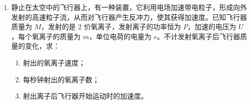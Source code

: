 \documentclass[\gkver]{gaokaozhenti}
\begin{document}
\begin{enumerate}
{$p = \frac{T}{T_{1}}p_{1}$                                                ①

以 $p_{1} = 76 - 16 = 60\UcmHg$，$T_{1} = 273 + 27 = 300\UK$，$T = 273\UK$

代入上式，得 $p = \frac{273}{300}\times 60 = 54.6\UcmHg$

$x = 76 - 54.6 = 21.4\Ucm$

（2）此时 A 泡内气体压强

$p' = 75 - 16 = 59\UcmHg$

实际温度：$T' = \frac{p'}{p}T_{1}$                                                ②

代入数据：$T' = \frac{59}{60}\times 300 = 295\UK = 22\UdC$

\textbf{评分标准}：（1）6 分。知道为等容过程并列出①式得 3 分，得出 $x = 21.4\Ucm$ 得 3 分。

（2）6 分。求出 $p' = 59\UcmHg$ 得 2 分，由公式②求出 $T = 295\UK$（或 $22\UdC$）得 4 分。其中公式②占 2 分，结果占 2 分。
}

\item
静止在太空中的飞行器上，有一种装置，它利用电场加速带电粒子，形成向外发射的高速粒子流，从而对飞行器产生反冲力，使其获得加速度。已知飞行器质量为 $M$，发射的是 2 价氧离子，发射离子的功率恒为 $P$，加速的电压为 $U$，每个氧离子的质量为 $m$，单位电荷的电量为 $e$。不计发射氧离子后飞行器质量的变化，求：
\begin{enumerate}
	\item
	射出的氧离子速度；
	\item
	每秒钟射出的氧离子数；
	\item
	射出离子后飞行器开始运动时的加速度。
\end{enumerate}

\end{enumerate}
\end{document}
